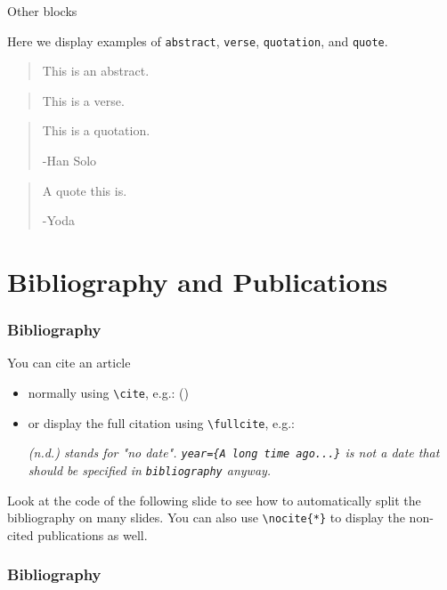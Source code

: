 \documentclass[usenames,dvipsnames,10pt]{beamer}
\begin{document}
\begin{frame}{Other blocks}

Here we display examples of \texttt{abstract}, \texttt{verse}, \texttt{quotation}, and \texttt{quote}.

\vskip 0.5cm

\begin{abstract}
This is an abstract.
\end{abstract}
\begin{verse}
This is a verse.
\end{verse}
\begin{quotation}
This is a quotation.

\raggedleft -Han Solo
\end{quotation}
\begin{quote}
A quote this is.

\raggedleft -Yoda
\end{quote}

\end{frame}

\section{Bibliography and Publications}
\begin{frame}[fragile]
\frametitle{Bibliography}

You can cite an article
\begin{itemize}
\item normally using \texttt{\textbackslash cite}, e.g.: (\cite{article1})
\item or display the full citation using \texttt{\textbackslash fullcite}, e.g.:   \\\vspace{0.4cm}

\textit{(n.d.) stands for "no date". \texttt{year=\{A long time ago...\}} is not a date that should be specified in \texttt{bibliography} anyway.}
\end{itemize}

\vskip 0.5cm
Look at the code of the following slide to see how to automatically split the bibliography on many slides. You can also use \texttt{\textbackslash nocite\{*\}} to display the non-cited publications as well.

\end{frame}

\begin{frame}[t,allowframebreaks]
\frametitle{Bibliography}

\nocite{*} %

\printbibliography

\end{frame}
\end{document}
